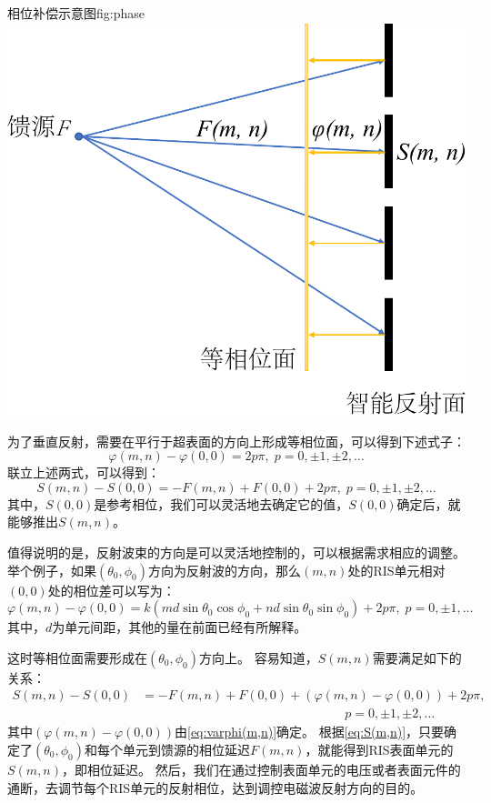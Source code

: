 \documentclass[supercite]{HustGraduPaper}
\begin{document}
\begin{generalfig}[htb]{相位补偿示意图}{fig:phase}
	\includegraphics[width=0.5\linewidth]{Figures/phase.pdf}
\end{generalfig}

为了垂直反射，需要在平行于超表面的方向上形成等相位面，可以得到下述式子：
\begin{equation}
	\varphi (m,n) - \varphi (0,0) = 2p \pi, \; p = 0, \pm 1,\pm 2,\dots 
\end{equation}
联立上述两式，可以得到：
\begin{equation}
	S(m,n)-S(0,0)=-F(m,n)+F(0,0)+2p\pi, \; p = 0, \pm 1,\pm 2,\dots 
\end{equation}
其中，$S(0,0)$是参考相位，我们可以灵活地去确定它的值，$S(0,0)$确定后，就能够推出$S(m,n)$。

值得说明的是，反射波束的方向是可以灵活地控制的，可以根据需求相应的调整。
举个例子，如果$(\theta_0,\phi_0)$方向为反射波的方向，那么$(m,n)$处的RIS单元相对$(0,0)$处的相位差可以写为：
\begin{equation}
	\varphi(m,n)-\varphi(0,0)=k(md\sin⁡\theta_0 \cos⁡\phi_0+nd\sin⁡\theta_0 \sin\phi_0)+2p\pi,\;p = 0, \pm 1,\dots 
	\label{eq:varphi(m,n)}
\end{equation}
其中，$d$为单元间距，其他的量在前面已经有所解释。

这时等相位面需要形成在$(\theta_0,\phi_0)$方向上。
容易知道，$S(m,n)$需要满足如下的关系：
\begin{equation}
	\begin{aligned}
		S(m,n)-S(0,0)&=-F(m,n)+F(0,0)+(\varphi(m,n)-\varphi(0,0))+2p\pi ,\\
			         &\qquad \qquad \qquad \qquad \qquad \qquad \qquad \qquad  p = 0, \pm 1, \pm 2,\dots 
	\end{aligned}
	\label{eq:S(m,n)}
\end{equation}
其中$(\varphi(m,n)-\varphi(0,0))$由\autoref{eq:varphi(m,n)}确定。
根据\autoref{eq:S(m,n)}，只要确定了$(\theta_0,\phi_0)$和每个单元到馈源的相位延迟$F(m,n)$，就能得到RIS表面单元的$S(m,n)$，即相位延迟。
然后，我们在通过控制表面单元的电压或者表面元件的通断，去调节每个RIS单元的反射相位，达到调控电磁波反射方向的目的。
\end{document}
